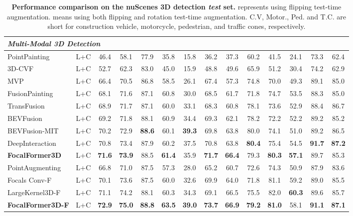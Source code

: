 \documentclass[10pt,twocolumn,letterpaper]{article}
\begin{document}
\begin{table*}[bpt]
\begin{center}
\begin{adjustbox}{width=1.\textwidth}
\begin{tabular}{lccccccccccccc}
			\midrule \midrule
                \multicolumn{5}{l}{\textit{Multi-Modal 3D Detection}} \\
                \midrule
			PointPainting \cite{pointpainting} & L+C & 46.4 & 58.1 & 77.9 & 35.8 & 15.8 & 36.2 & 37.3 & 60.2 & 41.5 & 24.1 & 73.3 & 62.4 \\
			3D-CVF \cite{3dcvf} & L+C & 52.7 & 62.3 & 83.0 & 45.0 & 15.9 & 48.8 & 49.6 & 65.9 & 51.2 & 30.4 & 74.2 & 62.9 \\
			MVP \cite{mvp} & L+C & 66.4 & 70.5 & 86.8 & 58.5 & 26.1 & 67.4 & 57.3 & 74.8 & 70.0 & 49.3 & 89.1 & 85.0 \\
			FusionPainting \cite{Fusionpainting} & L+C & 68.1 & 71.6 & 87.1 & 60.8 & 30.0 & 68.5 & 61.7 & 71.8 & 74.7 & 53.5 & 88.3 & 85.0 \\
			TransFusion \cite{transfusion} & L+C & 68.9 & 71.7 & 87.1 & 60.0 & 33.1 & 68.3 & 60.8 & 78.1 & 73.6 & 52.9 & 88.4 & 86.7 \\
			BEVFusion \cite{bevfusion} & L+C & 69.2 & 71.8 & 88.1 & 60.9 & 34.4 & 69.3 & 62.1 & 78.2 & 72.2 & 52.2 & 89.2 & 85.2 \\
			BEVFusion-MIT \cite{bevfusionmit} & L+C & 70.2 & 72.9 & \textbf{88.6} & 60.1 & \textbf{39.3} & 69.8 & 63.8 & 80.0 & 74.1 & 51.0 & 89.2 & 86.5 \\
			DeepInteraction \cite{deepinteraction} & L+C & 70.8 & 73.4 & 87.9 & 60.2 & 37.5 & 70.8 & 63.8 & \textbf{80.4} & 75.4 & 54.5 & \textbf{91.7} & \textbf{87.2} \\
			\textbf{FocalFormer3D} & L+C & \textbf{71.6} & \textbf{73.9} & 88.5 & \textbf{61.4} & 35.9 & \textbf{71.7} & \textbf{66.4} & 79.3 & \textbf{80.3} & \textbf{57.1} & 89.7 & 85.3 \\
			\midrule
			PointAugmenting \cite{pointaugmenting}  & L+C & 66.8 & 71.0 & 87.5 & 57.3 & 28.0 & 65.2 & 60.7 & 72.6 & 74.3 & 50.9 & 87.9 & 83.6 \\
			Focals Conv-F \cite{focalsconv}  & L+C & 70.1 & 73.6 & 87.5 & 60.0 & 32.6 & 69.9 & 64.0 & 71.8 & 81.1 & 59.2 & 89.0 & 85.5 \\
			LargeKernel3D-F \cite{largekernel3d}  & L+C & 71.1 & 74.2 & 88.1 & 60.3 & 34.3 & 69.1 & 66.5 & 75.5 & 82.0 & \textbf{60.3} & 89.6 & 85.7 \\
\textbf{FocalFormer3D-F}   & L+C & \textbf{72.9} & \textbf{75.0} & \textbf{88.8} & \textbf{63.5} & \textbf{39.0} & \textbf{73.7} & \textbf{66.9} & \textbf{79.2} & \textbf{81.0} & 58.1 & \textbf{91.1} & \textbf{87.1} \\
			\bottomrule
		\end{tabular}
		\end{adjustbox}
	\end{center}
	\caption{\textbf{Performance comparison on the nuScenes 3D detection \textit{test} set.}  represents using flipping test-time augmentation.  means using both flipping and rotation test-time augmentation. C.V, Motor., Ped. and T.C. are short for construction vehicle, motorcycle, pedestrian, and traffic cones, respectively.
}
	\label{tab: nuScenes test results}
\end{table*}
\end{document}
